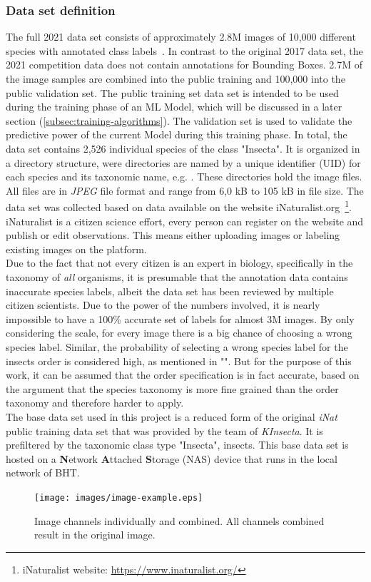 \subsubsection{Data set definition}
The full 2021 data set consists of approximately 2.8M images of 10,000 different species with annotated class labels~\cite{iNat-2021}.
In contrast to the original 2017 data set, the 2021 competition data does not contain annotations for Bounding Boxes.
2.7M of the image samples are combined into the public training and 100,000 into the public validation set.
The public training set data set is intended to be used during the training phase of an ML Model, which will be discussed in a later section (\ref{subsec:training-algorithms}).
The validation set is used to validate the predictive power of the current Model during this training phase.
In total, the data set contains 2,526 individual species of the class "Insecta".
It is organized in a directory structure, were directories are named by a unique identifier (UID) for each species and its taxonomic name, e.g. .
These directories hold the image files.
All files are in \textit{JPEG} file format and range from 6,0 kB to 105 kB in file size.
The data set was collected based on data available on the website iNaturalist.org~\footnote{iNaturalist website: \url{https://www.inaturalist.org/}}.
iNaturalist is a citizen science effort, every person can register on the website and publish or edit observations.
This means either uploading images or labeling existing images on the platform.\\
Due to the fact that not every citizen is an expert in biology, specifically in the taxonomy of \textit{all} organisms, it is presumable that the annotation data contains inaccurate species labels, albeit the data set has been reviewed by multiple citizen scientists.
Due to the power of the numbers involved, it is nearly impossible to have a 100\% accurate set of labels for almost 3M images.
By only considering the scale, for every image there is a big chance of choosing a wrong species label.
Similar, the probability of selecting a wrong species label for the insects order is considered high, as mentioned in "".
But for the purpose of this work, it can be assumed that the order specification is in fact accurate, based on the argument that the species taxonomy is more fine grained than the order taxonomy and therefore harder to apply.\\
The base data set used in this project is a reduced form of the original \textit{iNat} public training data set that was provided by the team of \textit{KInsecta}.
It is prefiltered by the taxonomic class type "Insecta", insects.
This base data set is hosted on a \textbf{N}etwork \textbf{A}ttached \textbf{S}torage (NAS) device that runs in the local network of BHT.
\begin{figure}[!ht]
    \centering
    \texttt{[image: images/image-example.eps]}
    \caption{Image channels individually and combined. All channels combined result in the original image.}
    \label{fig:image-example}
\end{figure}
